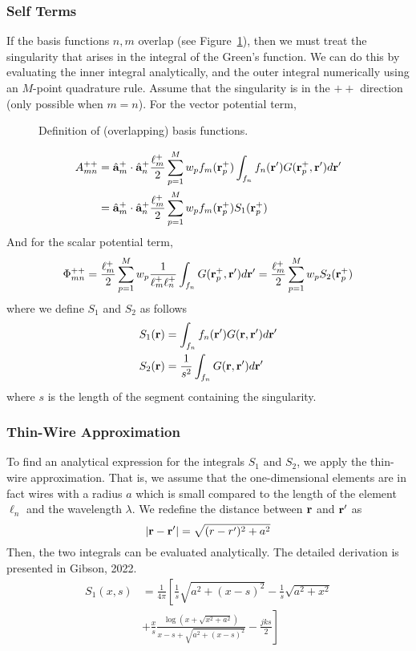 \subsubsection{Self Terms}
If the basis functions $n, m$ overlap (see Figure~\ref{fig:mom_basis3}), then we must treat the singularity that arises in the integral of the Green's function. We can do this by evaluating the inner integral analytically, and the outer integral numerically using an $M$-point quadrature rule. Assume that the singularity is in the $++$ direction (only possible when $m = n$). For the vector potential term,
\begin{figure}[b]
	\centering
	
	\caption{Definition of (overlapping) basis functions.}
	\label{fig:mom_basis3}
\end{figure}
\begin{align*}
	A_{mn}^{++} & = \hat{\mathbf{a}}_m^{+} \cdot \hat{\mathbf{a}}_n^{+} \frac{\ell_m^+}{2} \sum_{p = 1}^M w_p f_m(\mathbf{r}_p^+) \int_{f_n} f_n(\mathbf{r}^\prime) G(\mathbf{r}_p^+, \mathbf{r}^\prime) d\mathbf{r}^\prime \\
	& = \hat{\mathbf{a}}_m^{+} \cdot \hat{\mathbf{a}}_n^{+} \frac{\ell_m^+}{2} \sum_{p = 1}^M w_p f_m(\mathbf{r}_p^+) S_1(\mathbf{r}_p^+)
\end{align*}
And for the scalar potential term,
\begin{equation*}
	\Phi_{mn}^{++} = \frac{\ell_m^+}{2} \sum_{p = 1}^M w_p \frac{1}{\ell_m^+ \ell_n^+} \int_{f_n} G(\mathbf{r}_p^+, \mathbf{r}^\prime) d\mathbf{r}^\prime  = \frac{\ell_m^+}{2} \sum_{p = 1}^M w_p S_2(\mathbf{r}_p^+)
\end{equation*}
where we define $S_1$ and $S_2$ as follows
\begin{align}
	S_1(\mathbf{r}) & = \int_{f_n} f_n(\mathbf{r}^\prime) G(\mathbf{r}, \mathbf{r}^\prime) d\mathbf{r}^\prime \\
	S_2(\mathbf{r}) & = \frac{1}{s^2} \int_{f_n} G(\mathbf{r}, \mathbf{r}^\prime) d\mathbf{r}^\prime
\end{align}
where $s$ is the length of the segment containing the singularity. 

\subsubsection{Thin-Wire Approximation}
To find an analytical expression for the integrals $S_1$ and $S_2$, we apply the thin-wire approximation. That is, we assume that the one-dimensional elements are in fact wires with a radius $a$ which is small compared to the length of the element $\ell_n$ and the wavelength $\lambda$. We redefine the distance between $\mathbf{r}$ and $\mathbf{r}^\prime$ as
\begin{equation*}
	|\mathbf{r} - \mathbf{r}^\prime| = \sqrt{(r - r^\prime)^2 + a^2}
\end{equation*}
Then, the two integrals can be evaluated analytically. The detailed derivation is presented in Gibson, 2022.
\begin{equation}
	\begin{aligned}
		S_1(x, s) & = \frac{1}{4\pi} \left[ \frac{1}{s} \sqrt{a^2 + (x - s)^2} - \frac{1}{s} \sqrt{a^2 + x^2} \right. \\
		 & + \left. \frac{x}{s} \frac{\log\left( x + \sqrt{x^2 + a^2} \right)}{x - s + \sqrt{a^2 + (x - s)^2}} - \frac{j k s}{2} \right]
	\end{aligned}
\end{equation}

